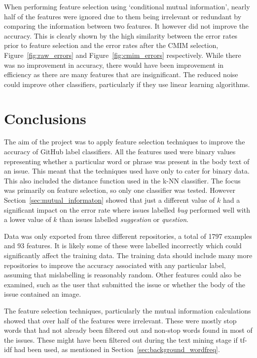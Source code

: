 When performing feature selection using `conditional mutual information', nearly half of the features were ignored due to them
being irrelevant or redundant by comparing the information between two features. It however did not improve the accuracy. This
is clearly shown by the high similarity between the error rates prior to feature selection and the error rates after the CMIM
selection, Figure~\ref{fig:raw_errors} and Figure~\ref{fig:cmim_errors} respectively. While there was no improvement in
accuracy, there would have been improvement in efficiency as there are many features that are insignificant. The reduced noise
could improve other classifiers, particularly if they use linear learning algorithms.

\section{Conclusions}
The aim of the project was to apply feature selection techniques to improve the accuracy of GitHub label classifiers. All the
features used were binary values representing whether a particular word or phrase was present in the body text of an issue. This
meant that the techniques used have only to cater for binary data. This also included the distance function used in the k-NN
classifier. The focus was primarily on feature selection, so only one classifier was tested. However
Section~\ref{sec:mutual_informaton} showed that just a different value of $k$ had a significant impact on the error rate where
issues labelled \textit{bug} performed well with a lower value of $k$ than issues labelled \textit{suggestion} or
\textit{question}.

Data was only exported from three different repositories, a total of 1797 examples and 93 features. It is likely some of these
were labelled incorrectly which could significantly affect the training data. The training data should include many more
repositories to improve the accuracy associated with any particular label, assuming that mislabelling is reasonably random.
Other features could also be examined, such as the user that submitted the issue or whether the body of the issue contained an
image.

The feature selection techniques, particularly the mutual information calculations showed that over half of the features were
irrelevant. These were mostly stop words that had not already been filtered out and non-stop words found in most of the issues.
These might have been filtered out during the text mining stage if tf-idf had been used, as mentioned in
Section~\ref{sec:background_wordfreq}.

